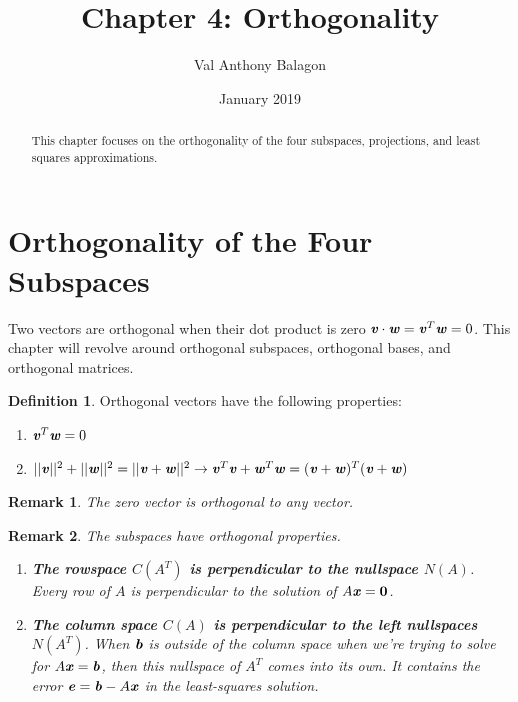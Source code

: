 \documentclass[12pt, letterpaper]{article}
\author{Val Anthony Balagon}
\date{January 2019}
\title{Chapter 4: Orthogonality}
\newcommand{\V}[1]{\textbf{\textit{#1}}}
\newcommand{\DefinitionSpace}{\vspace{15px}}
\newtheorem*{remark}{Remark}
\theoremstyle{definition}
\newtheorem{definition}{Definition}[section]
\begin{document}
	\maketitle
	\begin{abstract}
		This chapter focuses on the orthogonality of the four subspaces, projections, and least squares approximations.
	\end{abstract}

\section{Orthogonality of the Four Subspaces}

	Two vectors are orthogonal when their dot product is zero $\V{v} \cdot \V{w} = \V{v}^T \V{w} = 0$. This chapter will revolve around orthogonal subspaces, orthogonal bases, and orthogonal matrices.
	
	\DefinitionSpace
	\begin{definition}
		Orthogonal vectors have the following properties:
		\renewcommand{\theenumi}{\roman{enumi}}
		
		\begin{enumerate}[leftmargin=2\parindent]
			\item $\V{v}^T \V{w} = 0$
			\item $||\V{v}||^2 + ||\V{w}||^2 = ||\V{v} + \V{w}||^2 \rightarrow \V{v}^T\V{v} + \V{w}^T\V{w} = (\V{v}+\V{w})^T(\V{v}+\V{w})$
		\end{enumerate}	
	
	\end{definition} 	
	
	\DefinitionSpace
	\begin{remark}
		The zero vector is orthogonal to any vector.
	\end{remark}
	

	\DefinitionSpace
	\begin{remark}
		The subspaces have orthogonal properties. 
		\begin{enumerate}
			\item \textbf{The rowspace $C(A^T)$ is perpendicular to the nullspace $N(A)$}. Every row of $A$ is perpendicular to the solution of $A\V{x} = \textbf{0}$.
			\item \textbf{The column space $C(A)$ is perpendicular to the left nullspaces $N(A^T)$}. When $\V{b}$ is outside of the column space when we're trying to solve for $A\V{x} = \V{b}$, then this nullspace of $A^T$ comes into its own. It contains the error $\V{e} = \V{b} - A\V{x}$ in the least-squares solution.
		\end{enumerate}
	\end{remark}
	\DefinitionSpace
	
\end{document}
